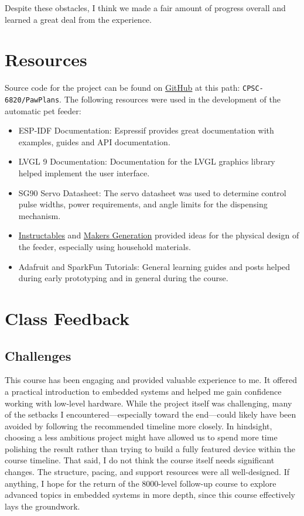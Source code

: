 \documentclass[12pt]{article}
\begin{document}
Despite these obstacles, I think we made a fair amount of progress overall and learned a great deal from the experience.

\section{Resources}
Source code for the project can be found on \href{https://github.com/openbraces/CPSC-6820}{GitHub} at this path: \texttt{CPSC-6820/PawPlans}.
The following resources were used in the development of the automatic pet feeder:
\begin{itemize}
    \item ESP-IDF Documentation: Espressif provides great documentation with examples, guides and API documentation.
    \item LVGL 9 Documentation: Documentation for the LVGL graphics library helped implement the user interface.
    \item SG90 Servo Datasheet: The servo datasheet was used to determine control pulse widths, power requirements, and angle limits for the dispensing mechanism.
    \item \href{https://www.instructables.com/Cereal-Dispenser-made-From-a-Cereal-Box/}{Instructables} and \href{https://www.makersgeneration.net/single-post/learn-electronics-for-beginners-how-to-make-a-diy-pet-feeder-with-an-arduino-board}{Makers Generation} provided ideas for the physical design of the feeder, especially using household materials.
    \item Adafruit and SparkFun Tutorials: General learning guides and posts helped during early prototyping and in general during the course.
\end{itemize}

\section{Class Feedback}

\subsection{Challenges}
This course has been engaging and provided valuable experience to me. It offered a practical introduction to embedded systems and helped me gain confidence working with low-level hardware. While the project itself was challenging, many of the setbacks I encountered---especially toward the end---could likely have been avoided by following the recommended timeline more closely. In hindsight, choosing a less ambitious project might have allowed us to spend more time polishing the result rather than trying to build a fully featured device within the course timeline. That said, I do not think the course itself needs significant changes. The structure, pacing, and support resources were all well-designed. If anything, I hope for the return of the 8000-level follow-up course to explore advanced topics in embedded systems in more depth, since this course effectively lays the groundwork.
\end{document}
